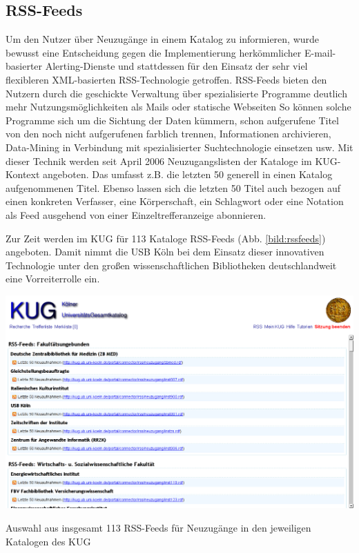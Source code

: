 \documentclass[11pt]{scrartcl}
\begin{document}
\subsection{RSS-Feeds}
Um den Nutzer über Neuzugänge in einem Katalog zu informieren, wurde
bewusst eine Entscheidung gegen die Implementierung herkömmlicher
E-mail-basierter Alerting-Dienste und stattdessen für den Einsatz der
sehr viel flexibleren XML-basierten RSS-Technologie
getroffen. RSS-Feeds bieten den Nutzern durch die geschickte
Verwaltung über spezialisierte Programme deutlich mehr
Nutzungsmöglichkeiten als Mails oder statische Webseiten So können
solche Programme sich um die Sichtung der Daten kümmern, schon
aufgerufene Titel von den noch nicht aufgerufenen farblich trennen,
Informationen archivieren, Data-Mining in Verbindung mit
spezialisierter Suchtechnologie einsetzen usw. Mit dieser Technik
werden seit April 2006 Neuzugangslisten der Kataloge im KUG-Kontext
angeboten. Das umfasst z.B. die letzten 50 generell in einen Katalog
aufgenommenen Titel. Ebenso lassen sich die letzten 50 Titel auch
bezogen auf einen konkreten Verfasser, eine Körperschaft, ein
Schlagwort oder eine Notation als Feed ausgehend von einer
Einzeltrefferanzeige abonnieren.

Zur Zeit werden im KUG für 113 Kataloge RSS-Feeds (Abb.
\ref{bild:rssfeeds}) angeboten. Damit nimmt die USB Köln bei dem
Einsatz dieser innovativen Technologie unter den großen
wissenschaftlichen Bibliotheken deutschlandweit eine Vorreiterrolle
ein.

\begin{shadowenv}
  \vspace{4mm}
    \centering \begin{minipage}[b]{1.0\textwidth}
      \centering \includegraphics[width=15cm]{openbib-bfp-2007_bilder/Abb-08-rssfeeds.png}
    \end{minipage}
    \caption{Auswahl aus insgesamt 113 RSS-Feeds für Neuzugänge in den jeweiligen Katalogen des KUG}
  \label{bild:rssfeeds}
  \vspace{3mm}
\end{shadowenv}
\end{document}

